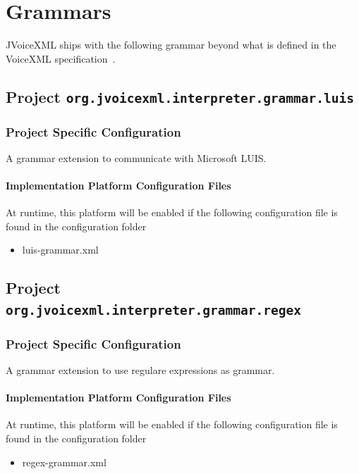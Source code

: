 \documentclass[11pt,a4paper]{article}
\begin{document}
\section{Grammars}

JVoiceXML ships with the following grammar beyond what is defined in the VoiceXML specification~\cite{w3.org:voicexml}.


\subsection{Project \texttt{org.jvoicexml.interpreter.grammar.luis}}

\subsubsection{Project Specific Configuration}

A grammar extension to communicate with Microsoft LUIS.

\paragraph{Implementation Platform Configuration Files}

At runtime, this platform will be enabled if the following configuration file is found in the configuration
folder
\begin{itemize}
\item luis-grammar.xml
\end{itemize}

\subsection{Project \texttt{org.jvoicexml.interpreter.grammar.regex}}

\subsubsection{Project Specific Configuration}

A grammar extension to use regulare expressions as grammar.

\paragraph{Implementation Platform Configuration Files}

At runtime, this platform will be enabled if the following configuration file is found in the configuration
folder
\begin{itemize}
\item regex-grammar.xml
\end{itemize}
\end{document}
